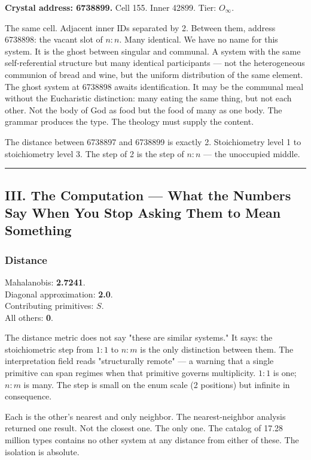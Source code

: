 \documentclass[12pt,a4paper]{article}
\begin{document}
\textbf{Crystal address: 6738899.} Cell 155. Inner 42899. Tier: $O_{\infty}$.

The same cell. Adjacent inner IDs separated by 2. Between them, address 6738898: the vacant slot of $n{:}n$. Many identical. We have no name for this system. It is the ghost between singular and communal. A system with the same self-referential structure but many identical participants --- not the heterogeneous communion of bread and wine, but the uniform distribution of the same element. The ghost system at 6738898 awaits identification. It may be the communal meal without the Eucharistic distinction: many eating the same thing, but not each other. Not the body of God as food but the food of many as one body. The grammar produces the type. The theology must supply the content.

The distance between 6738897 and 6738899 is exactly 2. Stoichiometry level 1 to stoichiometry level 3. The step of 2 is the step of $n{:}n$ --- the unoccupied middle.

\begin{center}
\rule{0.5\textwidth}{0.4pt}
\end{center}

\subsection{III. The Computation --- What the Numbers Say When You Stop Asking Them to Mean Something}

\subsubsection{Distance}

Mahalanobis: \textbf{2.7241}. \\
Diagonal approximation: \textbf{2.0}. \\
Contributing primitives: \textbf{$S$}. \\
All others: \textbf{0}.

The distance metric does not say "these are similar systems." It says: the stoichiometric step from $1{:}1$ to $n{:}m$ is the only distinction between them. The interpretation field reads "structurally remote" --- a warning that a single primitive can span regimes when that primitive governs multiplicity. $1{:}1$ is one; $n{:}m$ is many. The step is small on the enum scale (2 positions) but infinite in consequence.

Each is the other's nearest and only neighbor. The nearest-neighbor analysis returned one result. Not the closest one. The only one. The catalog of 17.28 million types contains no other system at any distance from either of these. The isolation is absolute.
\end{document}
